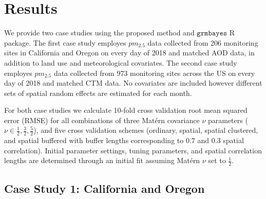 
\section*{Results}


We provide two case studies using the proposed method and $\texttt{grmbayes}$ R package.
The first case study employes $pm_{2.5}$ data collected from 206 monitoring sites in California and Oregon on every day of 2018 and matched AOD data, in addition to land use and meteorological covariates.
The second case study employes $pm_{2.5}$ data collected from 973 monitoring sites across the US on every day of 2018 and matched CTM data. 
No covariates are included however different sets of spatial random effects are estimated for each month.

For both case studies we calculate 10-fold cross validation root mean squared error (RMSE) for all combinations of three Mat\'{e}rn covariance $\nu$ parameters ($\nu \in {\frac{1}{2}, \frac{3}{2}, \frac{5}{2}}$), and five cross validation schemes (ordinary, spatial, spatial clustered, and spatial buffered with buffer lengths corresponding to $0.7$ and $0.3$ spatial correlation). 
Initial parameter settings, tuning parameters, and spatial correlation lengths are determined through an initial fit assuming Mat\'{e}rn $\nu$ set to $\frac{1}{2}$.


\subsection*{Case Study 1: California and Oregon}



    \begin{center}
        \label{tab:carmse}
        
    \end{center}

    \begin{center}
        \label{tab:monobs}
        \resizebox{\textwidth}{!}{
            
    }
    \end{center}

    \begin{center}
        \label{tab:monobs}
        
    \end{center}


